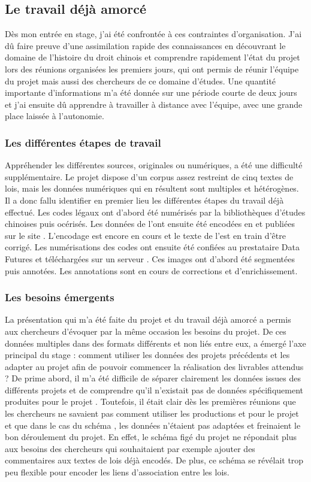 \subsection{Le travail déjà amorcé}
Dès mon entrée en stage, j'ai été confrontée à ces contraintes d'organisation. J'ai dû faire preuve d'une assimilation rapide des connaissances en découvrant le domaine de l'histoire du droit chinois et comprendre rapidement l'état du projet lors des réunions organisées les premiers jours, qui ont permis de réunir l'équipe du projet mais aussi des chercheurs de ce domaine d'études. Une quantité importante d'informations m'a été donnée sur une période courte de deux jours et j'ai ensuite dû apprendre à travailler à distance avec l'équipe, avec une grande place laissée à l'autonomie.

\subsubsection{Les différentes étapes de travail}
Appréhender les différentes sources, originales ou numériques, a été une difficulté supplémentaire. Le projet dispose d'un corpus assez restreint de cinq textes de lois, mais les données numériques qui en résultent sont multiples et hétérogènes. Il a donc fallu identifier en premier lieu les différentes étapes du travail déjà effectué. Les codes légaux ont d'abord été numérisés par la bibliothèques d'études chinoises puis océrisés. Les données de l'\OCR ont ensuite été encodées en \XML et publiées sur le site \LSC. L'encodage est encore en cours et le texte de l'\OCR est en train d'être corrigé. Les numérisations des codes ont ensuite été confiées au prestataire Data Futures et téléchargées sur un serveur \IIIF. Ces images ont d'abord été segmentées puis annotées. Les annotations sont en cours de corrections et d'enrichissement. 

\subsubsection{Les besoins émergents}
La présentation qui m'a été faite du projet et du travail déjà amorcé a permis aux chercheurs d'évoquer par la même occasion les besoins du projet. De ces données multiples dans des formats différents et non liés entre eux, a émergé l'axe principal du stage : comment utiliser les données des projets précédents et les adapter au projet \COREL afin de pouvoir commencer la réalisation des livrables attendus ? De prime abord, il m'a été difficile de séparer clairement les données issues des différents projets et de comprendre qu'il n'existait pas de données spécifiquement produites pour le projet \COREL. Toutefois, il était clair dès les premières réunions que les chercheurs ne savaient pas comment utiliser les productions \LSC et \EPJ pour le projet et que dans le cas du schéma \XML, les données n'étaient pas adaptées et freinaient le bon déroulement du projet. En effet, le schéma figé du projet \LSC ne répondait plus aux besoins des chercheurs qui souhaitaient par exemple ajouter des commentaires aux textes de lois déjà encodés. De plus, ce schéma se révélait trop peu flexible pour encoder les liens d'association entre les lois. 

